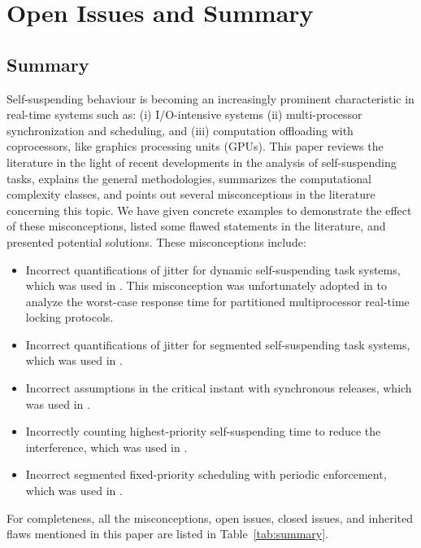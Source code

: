 \section{Open Issues and Summary}
\subsection{Summary}  
 Self-suspending behaviour is becoming an increasingly prominent
characteristic in real-time systems such as: (i) I/O-intensive systems
(ii) multi-processor synchronization and scheduling, and (iii)
computation offloading with coprocessors, like graphics processing
units (GPUs).  This paper reviews the literature in the light of
recent developments in the analysis of self-suspending tasks,
explains the general methodologies, summarizes the computational complexity classes, and points out several 
misconceptions in the literature concerning this topic. We
have given concrete examples to demonstrate the effect of these
misconceptions, listed some flawed statements in the literature, and
presented potential solutions. These misconceptions include:
\begin{itemize}
\item Incorrect quantifications of jitter for dynamic self-suspending
  task systems, which was used in
  \cite{ECRTS-AudsleyB04,RTAS-AudsleyB04,RTCSA-KimCPKH95,MingLiRTCSA1994}.  This
  misconception was unfortunately adopted in
  \cite{zeng-2011,bbb-2013,yang-2013,kim-2014,han-2014,carminati-2014,yang-2014,lakshmanan-2009} to analyze the worst-case response time for
  partitioned multiprocessor real-time locking protocols.
\item Incorrect quantifications of jitter for segmented self-suspending
  task systems, which was used in  \cite{RTCSA-BletsasA05}.
\item Incorrect assumptions in the critical instant with
  synchronous releases, which was used in \cite{LR:rtas10}.
\item Incorrectly counting highest-priority self-suspending time to reduce the
  interference, which was used in  \cite{RTSS-KimANR13}. 
\item Incorrect segmented fixed-priority scheduling with periodic
  enforcement, which was used in \cite{RTSS-KimANR13,DBLP:journals/ieicet/DingTT09}.
\end{itemize}
For completeness, all the misconceptions, open issues, closed issues,
and inherited flaws mentioned in this paper are listed in Table~\ref{tab:summary}.

